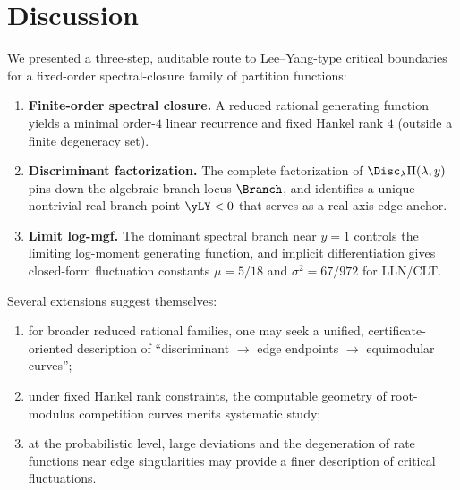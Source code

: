 \section{Discussion}

We presented a three-step, auditable route to Lee--Yang-type critical boundaries for a fixed-order spectral-closure family of partition functions:
\begin{enumerate}
  \item \textbf{Finite-order spectral closure.} A reduced rational generating function yields a minimal order-\(4\) linear recurrence and fixed Hankel rank \(4\) (outside a finite degeneracy set).
  \item \textbf{Discriminant factorization.} The complete factorization of \(\Disc_\lambda\Pi(\lambda,y)\) pins down the algebraic branch locus \(\Branch\), and identifies a unique nontrivial real branch point \(\yLY<0\) that serves as a real-axis edge anchor.
  \item \textbf{Limit log-mgf.} The dominant spectral branch near \(y=1\) controls the limiting log-moment generating function, and implicit differentiation gives closed-form fluctuation constants \(\mu=5/18\) and \(\sigma^2=67/972\) for LLN/CLT.
\end{enumerate}

Several extensions suggest themselves:
\begin{enumerate}
  \item for broader reduced rational families, one may seek a unified, certificate-oriented description of ``discriminant \(\rightarrow\) edge endpoints \(\rightarrow\) equimodular curves'';
  \item under fixed Hankel rank constraints, the computable geometry of root-modulus competition curves merits systematic study;
  \item at the probabilistic level, large deviations and the degeneration of rate functions near edge singularities may provide a finer description of critical fluctuations.
\end{enumerate}

